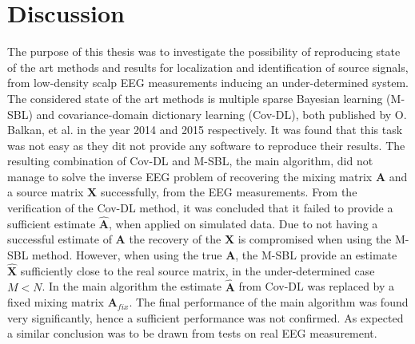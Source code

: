 \chapter{Discussion}
The purpose of this thesis was to investigate the possibility of reproducing state of the art methods and results for localization and identification of source signals, from low-density scalp EEG measurements inducing an under-determined system.
The considered state of the art methods is multiple sparse Bayesian learning (M-SBL)\cite{Balkan2014} and covariance-domain dictionary learning (Cov-DL)\cite{Balkan2015}, both published by O. Balkan, et al. in the year 2014 and 2015 respectively. 
It was found that this task was not easy as they dit not provide any software to reproduce their results. The resulting combination of Cov-DL and M-SBL, the main algorithm, did not manage to solve the inverse EEG problem of recovering the mixing matrix $\textbf{A}$ and a source matrix $\textbf{X}$ successfully, from the EEG measurements. 
From the verification of the Cov-DL method, it was concluded that it failed to provide a sufficient estimate $\hat{\mathbf{A}}$, when applied on simulated data. 
Due to not having a successful estimate of $\textbf{A}$ the recovery of the $\textbf{X}$ is compromised when using the M-SBL method.
However, when using the true $\mathbf{A}$, the M-SBL provide an estimate $\hat{\mathbf{X}}$ sufficiently close to the real source matrix, in the under-determined case $M<N$. 
In the main algorithm the estimate $\hat{\textbf{A}}$ from Cov-DL was replaced by a fixed mixing matrix $\textbf{A}_{fix}$. The final performance of the main algorithm was found very significantly, hence a sufficient performance was not confirmed. As expected a similar conclusion was to be drawn from tests on real EEG measurement. 

